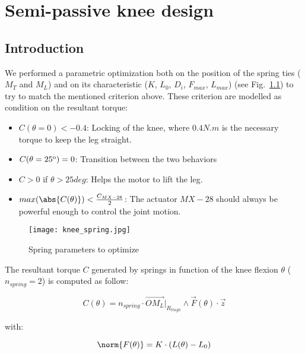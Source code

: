 \chapter{Semi-passive knee design} %
\label{appendix:knee_optimization}

\section{Introduction} %

We performed a parametric optimization both on the position of the spring ties ($M_T$ and $M_L$) and on its characteristic ($K$, $L_0$, $D_i$, $F_{max}$, $L_{max}$) (see Fig.~\ref{fig:knee_conception}) to try to match the mentioned criterion above. These criterion are modelled as condition on the resultant torque:

\begin{itemize}
    \item $C(\theta=0) < -0.4$: Locking of the knee, where $0.4 N.m$ is the necessary torque to keep the leg straight.
    \item $C(\theta=25 \textsuperscript{o} ) = 0$: Transition between the two behaviors
    \item $C > 0$ if $\theta > 25 deg$: Helps the motor to lift the leg.
    \item $ max(\abs{C(\theta)}) < \frac{C_{MX-28}}{2}$: The actuator $MX-28$ should always be powerful enough to control the joint motion.
\end{itemize}

\begin{figure}[h]
    \centering
    \texttt{[image: knee\_spring.jpg]}
    \caption{Spring parameters to optimize}
    \label{fig:knee_conception}
\end{figure}


The resultant torque $C$ generated by springs in function of the knee flexion $\theta$  ($n_{spring} = 2$) is computed as follow:

\begin{equation}
    C(\theta) = n_{spring} \cdot \overrightarrow{OM_L}{\rvert}_{R_{thigh}} \wedge \overrightarrow{F}(\theta) \cdot \overrightarrow{z}
\end{equation}

with:

\begin{equation}
    \norm{ F(\theta)} = K \cdot \left ( L(\theta) - L_0\right )
\end{equation}

